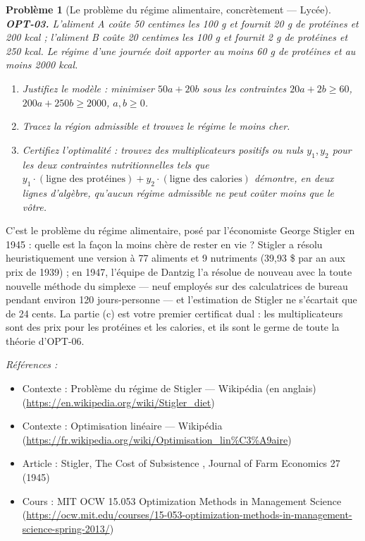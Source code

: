 \documentclass[11pt]{article}
\newtheorem{problem}{Problème}
\newenvironment{refs}{\par\small\noindent\emph{Références :}\begin{itemize}\setlength\itemsep{0pt}}{\end{itemize}\normalsize}
\begin{document}
\begin{problem}[{Le problème du régime alimentaire, concrètement --- Lycée}]
\textbf{OPT-03.} L'aliment A coûte 50 centimes les 100 g et fournit 20 g de protéines et 200 kcal ; l'aliment B coûte 20 centimes les 100 g et fournit 2 g de protéines et 250 kcal. Le régime d'une journée doit apporter au moins 60 g de protéines et au moins 2000 kcal.
\begin{enumerate}
\item[(a)] Justifiez le modèle : minimiser $50a + 20b$ sous les contraintes $20a + 2b \ge 60$, $200a + 250b \ge 2000$, $a, b \ge 0$.
\item[(b)] Tracez la région admissible et trouvez le régime le moins cher.
\item[(c)] Certifiez l'optimalité : trouvez des multiplicateurs positifs ou nuls $y_1, y_2$ pour les deux contraintes nutritionnelles tels que $y_1 \cdot (\text{ligne des protéines}) + y_2 \cdot (\text{ligne des calories})$ démontre, en deux lignes d'algèbre, qu'aucun régime admissible ne peut coûter moins que le vôtre.
\end{enumerate}

\end{problem}

\noindent C'est le problème du régime alimentaire, posé par l'économiste George Stigler en 1945 : quelle est la façon la moins chère de rester en vie ? Stigler a résolu heuristiquement une version à 77 aliments et 9 nutriments (39,93 \$ par an aux prix de 1939) ; en 1947, l'équipe de Dantzig l'a résolue de nouveau avec la toute nouvelle méthode du simplexe --- neuf employés sur des calculatrices de bureau pendant environ 120 jours-personne --- et l'estimation de Stigler ne s'écartait que de 24 cents. La partie (c) est votre premier certificat dual : les multiplicateurs sont des prix pour les protéines et les calories, et ils sont le germe de toute la théorie d'OPT-06.

\begin{refs}
\item Contexte : Problème du régime de Stigler --- Wikipédia (en anglais) (\url{https://en.wikipedia.org/wiki/Stigler_diet})
\item Contexte : Optimisation linéaire --- Wikipédia (\url{https://fr.wikipedia.org/wiki/Optimisation_lin%C3%A9aire})
\item Article : Stigler, \og{} The Cost of Subsistence \fg{}, Journal of Farm Economics 27 (1945)
\item Cours : MIT OCW 15.053 Optimization Methods in Management Science (\url{https://ocw.mit.edu/courses/15-053-optimization-methods-in-management-science-spring-2013/})
\end{refs}
\end{document}
